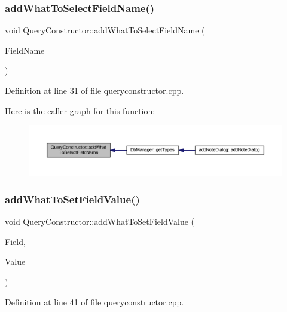 \subsubsection{\texorpdfstring{add\+What\+To\+Select\+Field\+Name()}{addWhatToSelectFieldName()}}
{\footnotesize\ttfamily void Query\+Constructor\+::add\+What\+To\+Select\+Field\+Name (\begin{DoxyParamCaption}\item[{const Q\+String \&}]{Field\+Name }\end{DoxyParamCaption})}



Definition at line 31 of file queryconstructor.\+cpp.

Here is the caller graph for this function\+:
\nopagebreak
\begin{figure}[H]
\begin{center}
\leavevmode
\includegraphics[width=350pt]{classQueryConstructor_ab184e96ccdb30c0d6bedd904b6614e12_icgraph}
\end{center}
\end{figure}
\hypertarget{classQueryConstructor_a651b75170a7a1c7ddeae3758889133b0}{}\label{classQueryConstructor_a651b75170a7a1c7ddeae3758889133b0} 
\subsubsection{\texorpdfstring{add\+What\+To\+Set\+Field\+Value()}{addWhatToSetFieldValue()}}
{\footnotesize\ttfamily void Query\+Constructor\+::add\+What\+To\+Set\+Field\+Value (\begin{DoxyParamCaption}\item[{const Q\+String \&}]{Field,  }\item[{const Q\+String \&}]{Value }\end{DoxyParamCaption})}



Definition at line 41 of file queryconstructor.\+cpp.

\hypertarget{classQueryConstructor_ad72f9e11656f92958cd6751eaaa70e0e}{}\label{classQueryConstructor_ad72f9e11656f92958cd6751eaaa70e0e} 
